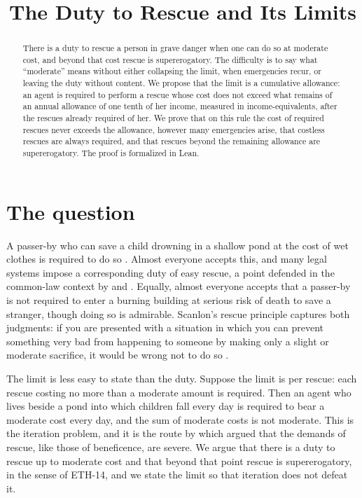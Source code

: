 \documentclass{situationist-preprint}
\title{The Duty to Rescue and Its Limits}
\begin{document}
\maketitle

\begin{abstract}
There is a duty to rescue a person in grave danger when one can do so at moderate cost, and beyond that cost rescue is supererogatory. The difficulty is to say what ``moderate'' means without either collapsing the limit, when emergencies recur, or leaving the duty without content. We propose that the limit is a cumulative allowance: an agent is required to perform a rescue whose cost does not exceed what remains of an annual allowance of one tenth of her income, measured in income-equivalents, after the rescues already required of her. We prove that on this rule the cost of required rescues never exceeds the allowance, however many emergencies arise, that costless rescues are always required, and that rescues beyond the remaining allowance are supererogatory. The proof is formalized in Lean.
\end{abstract}

\section{The question}

A passer-by who can save a child drowning in a shallow pond at the cost of wet clothes is required to do so \citep{Singer1972}. Almost everyone accepts this, and many legal systems impose a corresponding duty of easy rescue, a point defended in the common-law context by \citet{Weinrib1980} and \citet{Feinberg1984}. Equally, almost everyone accepts that a passer-by is not required to enter a burning building at serious risk of death to save a stranger, though doing so is admirable. Scanlon's rescue principle captures both judgments: if you are presented with a situation in which you can prevent something very bad from happening to someone by making only a slight or moderate sacrifice, it would be wrong not to do so \citep[ch.~5]{Scanlon1998}.

The limit is less easy to state than the duty. Suppose the limit is per rescue: each rescue costing no more than a moderate amount is required. Then an agent who lives beside a pond into which children fall every day is required to bear a moderate cost every day, and the sum of moderate costs is not moderate. This is the iteration problem, and it is the route by which \citet{Unger1996} argued that the demands of rescue, like those of beneficence, are severe. We argue that there is a duty to rescue up to moderate cost and that beyond that point rescue is supererogatory, in the sense of ETH-14, and we state the limit so that iteration does not defeat it.
\end{document}
